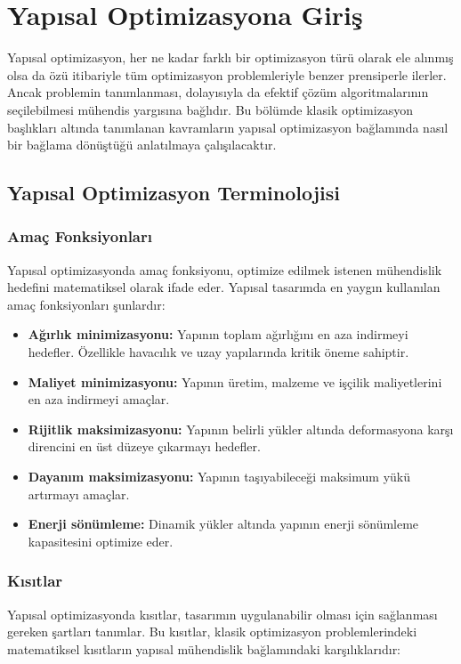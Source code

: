 \section{Yapısal Optimizasyona Giriş}
Yapısal optimizasyon, her ne kadar farklı bir optimizasyon türü olarak ele alınmış olsa da özü itibariyle tüm optimizasyon problemleriyle benzer prensiperle ilerler. Ancak problemin tanımlanması, dolayısıyla da efektif çözüm algoritmalarının seçilebilmesi mühendis yargısına bağlıdır. Bu bölümde klasik optimizasyon başlıkları altında tanımlanan kavramların yapısal optimizasyon bağlamında nasıl bir bağlama dönüştüğü anlatılmaya çalışılacaktır.

\subsection{Yapısal Optimizasyon Terminolojisi}

\subsubsection{Amaç Fonksiyonları}
Yapısal optimizasyonda amaç fonksiyonu, optimize edilmek istenen mühendislik hedefini matematiksel olarak ifade eder. Yapısal tasarımda en yaygın kullanılan amaç fonksiyonları şunlardır:

\begin{itemize}
    \item \textbf{Ağırlık minimizasyonu:} Yapının toplam ağırlığını en aza indirmeyi hedefler. Özellikle havacılık ve uzay yapılarında kritik öneme sahiptir.
    \item \textbf{Maliyet minimizasyonu:} Yapının üretim, malzeme ve işçilik maliyetlerini en aza indirmeyi amaçlar.
    \item \textbf{Rijitlik maksimizasyonu:} Yapının belirli yükler altında deformasyona karşı direncini en üst düzeye çıkarmayı hedefler.
    \item \textbf{Dayanım maksimizasyonu:} Yapının taşıyabileceği maksimum yükü artırmayı amaçlar.
    \item \textbf{Enerji sönümleme:} Dinamik yükler altında yapının enerji sönümleme kapasitesini optimize eder.
\end{itemize}

\subsubsection{Kısıtlar}
Yapısal optimizasyonda kısıtlar, tasarımın uygulanabilir olması için sağlanması gereken şartları tanımlar. Bu kısıtlar, klasik optimizasyon problemlerindeki matematiksel kısıtların yapısal mühendislik bağlamındaki karşılıklarıdır:

